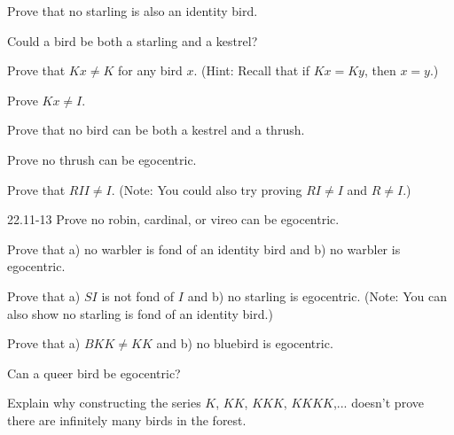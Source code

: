 \documentclass[12pt, letterpaper]{article}
\begin{document}
\begin{prob}{22.4}  
Prove that no starling is also an identity bird.
\end{prob}

\begin{prob}{22.5}  
Could a bird be both a starling and a kestrel?
\end{prob}

\begin{prob}{22.6}  
Prove that $Kx \neq K$ for any bird $x$. (Hint: Recall that if $Kx = Ky$, then $x = y$.)
\end{prob}

\begin{prob}{22.7}  
Prove $Kx \neq I$.
\end{prob}

\begin{prob}{22.8}  
Prove that no bird can be both a kestrel and a thrush.
\end{prob}

\begin{prob}{22.9}  
Prove no thrush can be egocentric.
\end{prob}

\begin{prob}{22.10} 
Prove that $RII \neq I$. (Note: You could also try proving $RI \neq I$ and $R \neq I$.)
\end{prob}

\begin{prob}{22.11-13} 
Prove no robin, cardinal, or vireo can be egocentric.
\end{prob}

\begin{prob}{22.14} 
Prove that a) no warbler is fond of an identity bird and b) no warbler is egocentric.
\end{prob}

\begin{prob}{22.15}
Prove that a) $SI$ is not fond of $I$ and b) no starling is egocentric. (Note: You can also show no starling is fond of an identity bird.)
\end{prob}

\begin{prob}{22.16} 
Prove that a) $BKK \neq KK$ and b) no bluebird is egocentric.
\end{prob}

\begin{prob}{22.17} 
Can a queer bird be egocentric?
\end{prob}

\begin{prob}{22.18} 
Explain why constructing the series $K$, $KK$, $KKK$, $KKKK$,... doesn't prove there are infinitely many birds in the forest.
\end{prob}
\end{document}
